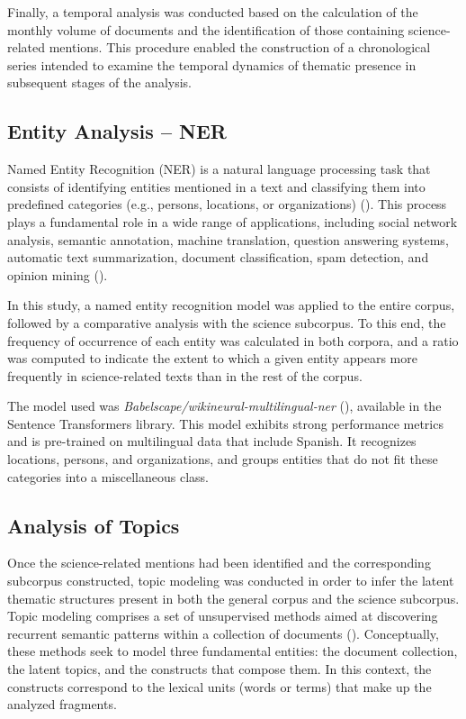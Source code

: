 \documentclass[11pt,a4paper]{article}
\begin{document}
	Finally, a temporal analysis was conducted based on the calculation of the monthly volume of documents and the identification of those containing science-related mentions. This procedure enabled the construction of a chronological series intended to examine the temporal dynamics of thematic presence in subsequent stages of the analysis.
	
	
	
	\subsection{Entity Analysis – NER}
	
	
	Named Entity Recognition (NER) is a natural language processing task that consists of identifying entities mentioned in a text and classifying them into predefined categories (e.g., persons, locations, or organizations) (\cite{Jehangir2023}). This process plays a fundamental role in a wide range of applications, including social network analysis, semantic annotation, machine translation, question answering systems, automatic text summarization, document classification, spam detection, and opinion mining (\cite{Jehangir2023}).
	
	In this study, a named entity recognition model was applied to the entire corpus, followed by a comparative analysis with the science subcorpus. To this end, the frequency of occurrence of each entity was calculated in both corpora, and a ratio was computed to indicate the extent to which a given entity appears more frequently in science-related texts than in the rest of the corpus.
	
	The model used was\textit{ Babelscape/wikineural-multilingual-ner} (\cite{tedeschi-etal-2021-wikineural-combined}), available in the Sentence Transformers library. This model exhibits strong performance metrics and is pre-trained on multilingual data that include Spanish. It recognizes locations, persons, and organizations, and groups entities that do not fit these categories into a miscellaneous class.
	
	
	
	\subsection{Analysis of Topics}\label{sec:topic_model}
	
	
	Once the science-related mentions had been identified and the corresponding subcorpus constructed, topic modeling was conducted in order to infer the latent thematic structures present in both the general corpus and the science subcorpus. Topic modeling comprises a set of unsupervised methods aimed at discovering recurrent semantic patterns within a collection of documents (\cite{Abdelrazek2023}). Conceptually, these methods seek to model three fundamental entities: the document collection, the latent topics, and the constructs that compose them. In this context, the constructs correspond to the lexical units (words or terms) that make up the analyzed fragments.
\end{document}
